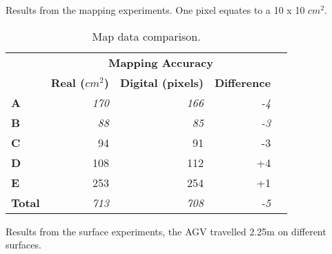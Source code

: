 Results from the mapping experiments. One pixel equates to a 10 x 10 $cm^2$.
\newline

\begin{table}[H]
\def\arraystretch{1.2}
\centering
\begin{tabular}{l|rrr|l}
\cline{2-4}
                                     & \multicolumn{3}{c|}{\textbf{Mapping Accuracy}}                                                                               &  \\ \cline{1-4}
\multicolumn{1}{|l|}{}               & \multicolumn{1}{c|}{\textbf{Real \boldmath($cm^2$)}} & \multicolumn{1}{c|}{\textbf{Digital (pixels)}} & \multicolumn{1}{c|}{\textbf{Difference}} &  \\ \cline{1-4}
\multicolumn{1}{|l|}{\textbf{A}}     & \multicolumn{1}{r|}{\textit{170}}    & \multicolumn{1}{r|}{\textit{166}}         & \textit{-4}                              &  \\ \cline{1-4}
\multicolumn{1}{|l|}{\textbf{B}}     & \multicolumn{1}{r|}{\textit{88}}    & \multicolumn{1}{r|}{\textit{85}}          & \textit{-3}                              &  \\ \cline{1-4}
\multicolumn{1}{|l|}{\textbf{C}}     & \multicolumn{1}{r|}{94}             & \multicolumn{1}{r|}{91}                   & -3                                       &  \\ \cline{1-4}
\multicolumn{1}{|l|}{\textbf{D}}     & \multicolumn{1}{r|}{108}             & \multicolumn{1}{r|}{112}                  & +4                                       &  \\ \cline{1-4}
\multicolumn{1}{|l|}{\textbf{E}}     & \multicolumn{1}{r|}{253}             & \multicolumn{1}{r|}{254}                  & +1                                       &  \\ \cline{1-4}
\multicolumn{1}{|l|}{\textbf{Total}} & \multicolumn{1}{r|}{\textit{713}}    & \multicolumn{1}{r|}{\textit{708}}         & \textit{-5}                              &  \\ \cline{1-4}
\end{tabular}
\caption{Map data comparison.}
\label{table:maptable}
\end{table}


Results from the surface experiments, 
the AGV travelled 2.25m on different surfaces.

